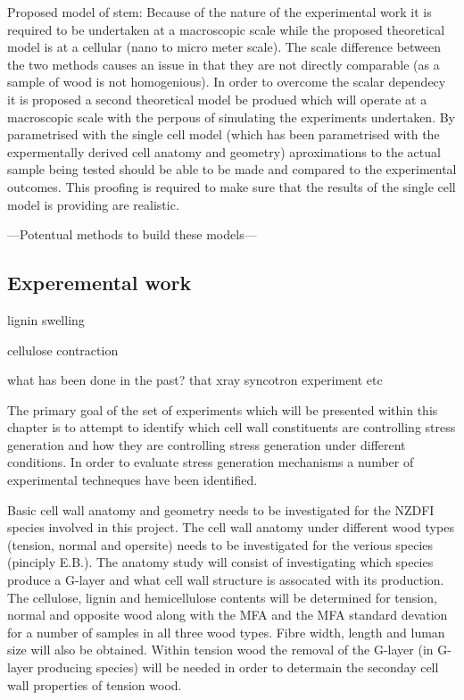 \documentclass{article}
\begin{document}
Proposed model of stem:
Because of the nature of the experimental work it is required to be undertaken
at a macroscopic scale while the proposed theoretical model is at a cellular
(nano to micro meter scale). The scale difference between the two methods causes
an issue in that they are not directly comparable (as a sample of wood is not
homogenious). In order to overcome the scalar dependecy it is proposed a second
theoretical model be produed which will operate at a macroscopic scale with the
perpous of simulating the experiments undertaken. By parametrised with the
single cell model (which has been parametrised with the expermentally derived
cell anatomy and geometry) aproximations to the actual sample being tested
should be able to be made and compared to the experimental outcomes. This
proofing is required to make sure that the results of the single cell model is
providing are realistic.

---Potentual methods to build these models---

\subsection{Experemental work}

lignin swelling

cellulose contraction

what has been done in the past?
that xray syncotron experiment etc

The primary goal of the set of experiments which will be presented within this
chapter is to attempt to identify which cell wall constituents are controlling
stress generation and how they are controlling stress generation under different
conditions. In order to evaluate stress generation mechanisms a number of
experimental techneques have been identified.

Basic cell wall anatomy and geometry needs to be investigated for the NZDFI
species involved in this project. The cell wall anatomy under different wood
types (tension, normal and opersite) needs to be investigated for the verious
species (pinciply E.B.). The anatomy study will consist of investigating which
species produce a G-layer and what cell wall structure is assocated with its
production. The cellulose, lignin and hemicellulose contents will be determined
for tension, normal and opposite wood along with the MFA and the MFA standard
devation for a number of samples in all three wood types. Fibre width, length
and luman size will also be obtained. Within tension wood the removal of the
G-layer (in G-layer producing species) will be needed in order to determain the
seconday cell wall properties of tension wood.
\end{document}
